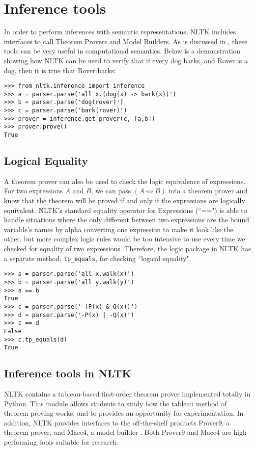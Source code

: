 \documentclass[11pt]{article}
\newcommand{\dhgcode}[1]{{\tt #1}}
\begin{document}
\section{Inference tools}
In order to perform inferences with semantic representations, NLTK includes interfaces to call Theorem Provers and Model Builders.  As is discussed in \cite{BB}, these tools can be very useful in computational semantics.  Below is a demonstration showing how NLTK can be used to verify that if every dog barks, and Rover is a dog, then it is true that Rover barks:

\begin{verbatim}
>>> from nltk.inference import inference
>>> a = parser.parse('all x.(dog(x) -> bark(x))')
>>> b = parser.parse('dog(rover)')
>>> c = parser.parse('bark(rover)')
>>> prover = inference.get_prover(c, [a,b])
>>> prover.prove()
True
\end{verbatim}

\subsection{Logical Equality}
A theorem prover can also be used to check the logic equivalence of expressions.  For two expressions $A$ and $B$, we can pass $(A\iff B)$ into a theorem prover and know that the theorem will be proved if and only if the expressions are logically equivalent.  NLTK's standard equality operator for Expressions (``==") is able to handle situations where the only different between two expressions are the bound variable's names by alpha converting one expression to make it look like the other, but more complex logic rules would be too intensive to use every time we checked for equality of two expressions.  Therefore, the logic package in NLTK has a separate method, \dhgcode{tp\_equals}, for checking ``logical equality".

\begin{verbatim}
>>> a = parser.parse('all x.walk(x)')
>>> b = parser.parse('all y.walk(y)')
>>> a == b
True
>>> c = parser.parse('-(P(x) & Q(x))')
>>> d = parser.parse('-P(x) | -Q(x)')
>>> c == d
False
>>> c.tp_equals(d)
True
\end{verbatim}

\subsection{Inference tools in NLTK}
NLTK contains a tableau-based first-order theorem prover implemented totally in Python.  This module allows students to study how the tableau method of theorem proving works, and to provides an opportunity for experimentation.  In addition, NLTK provides interfaces to the off-the-shelf products Prover9, a theorem prover, and Mace4, a model builder \cite{McCune}.  Both Prover9 and Mace4 are high-performing tools suitable for research.
\end{document}
